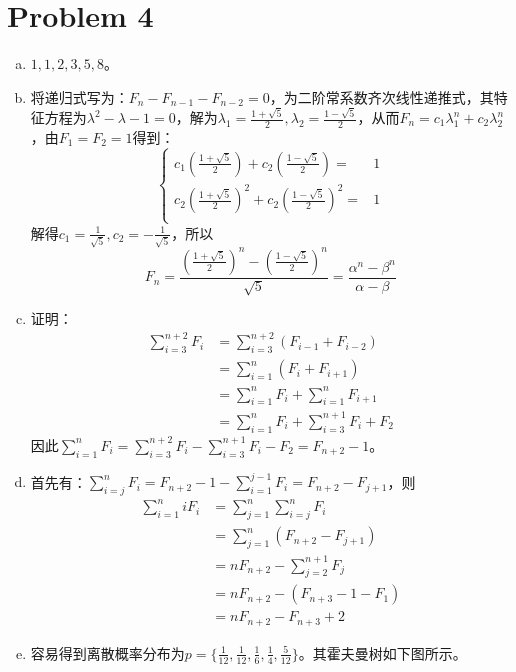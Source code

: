 \documentclass[a4paper,UTF8]{article}
\numberwithin{equation}{section}
\begin{document}
\section*{Problem 4}
\begin{enumerate}[(a)]
	\item $1,1,2, 3, 5, 8$。
	\item 将递归式写为：$F_n-F_{n-1}-F_{n-2}=0$，为二阶常系数齐次线性递推式，其特征方程为$\lambda^2-\lambda-1=0$，解为$\lambda_1=\frac{1+\sqrt{5}}{2},\lambda_2=\frac{1-\sqrt{5}}{2}$，从而$F_n=c_1\lambda_1^n+c_2\lambda_2^n$，由$F_1=F_2=1$得到：
	$$\left\{\begin{aligned}
c_1(\frac{1+\sqrt{5}}{2})+c_2(\frac{1-\sqrt{5}}{2}) = & 1 \\
c_2(\frac{1+\sqrt{5}}{2})^2+c_2(\frac{1-\sqrt{5}}{2})^2 = & 1 \\
\end{aligned}\right.$$
解得$c_1=\frac{1}{\sqrt{5}}, c_2=-\frac{1}{\sqrt{5}}$，所以
$$F_n=\frac{(\frac{1+\sqrt{5}}{2})^n-(\frac{1-\sqrt{5}}{2})^n}{\sqrt{5}}=\frac{\alpha^n-\beta^n}{\alpha-\beta}$$
    \item 证明：
    \begin{align*}
    \sum_{i=3}^{n+2}F_i&=\sum_{i=3}^{n+2}(F_{i-1}+F_{i-2})\\
                       &=\sum_{i=1}^{n}(F_{i}+F_{i+1})\\
                       &=\sum_{i=1}^{n}F_{i}+\sum_{i=1}^{n}F_{i+1}\\
                       &=\sum_{i=1}^{n}F_{i}+\sum_{i=3}^{n+1}F_{i} + F_2
    \end{align*}
    因此$\sum_{i=1}^{n}F_{i} =\sum_{i=3}^{n+2}F_i-\sum_{i=3}^{n+1}F_{i}-F_2=F_{n+2}-1 $。
    \item 首先有：$\sum_{i=j}^nF_i=F_{n+2}-1-\sum_{i=1}^{j-1}F_i=F_{n+2}-F_{j+1}$，则
    \begin{align*}
        \sum_{i=1}^niF_i &=\sum_{j=1}^n\sum_{i=j}^n F_i\\
              &=\sum_{j=1}^n(F_{n+2}-F_{j+1})\\
              &=nF_{n+2}-\sum_{j=2}^{n+1}F_{j}\\
              &=nF_{n+2}-(F_{n+3}-1-F_1)\\
              &=nF_{n+2}-F_{n+3}+2
              \end{align*}
    \item 容易得到离散概率分布为$p=\{\frac{1}{12},\frac{1}{12},\frac{1}{6},\frac{1}{4},\frac{5}{12}\}$。其霍夫曼树如下图所示。
        \begin{figure}[H]

\end{figure}
\end{enumerate}
\end{document}
